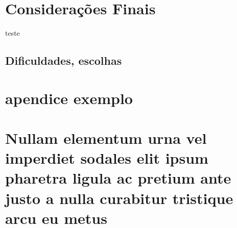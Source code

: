 \documentclass[
	12pt,				%
	openright,			%
	twoside,			%
	a4paper,			%
	english,			%
	french,				%
	spanish,			%
	brazil				%
	]{abntex2}
\begin{document}
\chapter{Considerações Finais}
teste

\section{Dificuldades, escolhas}




\lipsum[24]





\postextual




%
%


\begin{apendicesenv}

\partapendices

\chapter{apendice exemplo}

\lipsum[50]

\chapter{Nullam elementum urna vel imperdiet sodales elit ipsum pharetra ligula
ac pretium ante justo a nulla curabitur tristique arcu eu metus}
\lipsum[55-57]

\end{apendicesenv}
\end{document}
